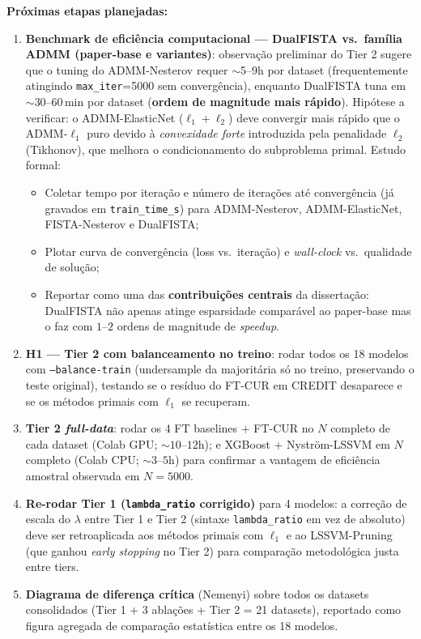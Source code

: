 \documentclass[12pt,a4paper]{article}
\begin{document}
\textbf{Próximas etapas planejadas:}
\begin{enumerate}\sloppy
  \item \textbf{Benchmark de eficiência computacional --- DualFISTA vs.\
        família ADMM (paper-base e variantes)}: observação preliminar do
        Tier 2 sugere que o tuning do ADMM-Nesterov requer $\sim$5--9h por
        dataset (frequentemente atingindo \texttt{max\_iter}=5000 sem
        convergência), enquanto DualFISTA tuna em $\sim$30--60\,min por
        dataset (\textbf{ordem de magnitude mais rápido}). Hipótese a
        verificar: o ADMM-ElasticNet ($\ell_1 + \ell_2$) deve convergir
        mais rápido que o ADMM-$\ell_1$ puro devido à \emph{convexidade
        forte} introduzida pela penalidade $\ell_2$ (Tikhonov), que
        melhora o condicionamento do subproblema primal. Estudo formal:
        \begin{itemize}
          \item Coletar tempo por iteração e número de iterações até
                convergência (já gravados em \texttt{train\_time\_s})
                para ADMM-Nesterov, ADMM-ElasticNet, FISTA-Nesterov
                e DualFISTA;
          \item Plotar curva de convergência (loss vs.\ iteração) e
                \emph{wall-clock} vs.\ qualidade de solução;
          \item Reportar como uma das \textbf{contribuições centrais} da
                dissertação: DualFISTA não apenas atinge esparsidade
                comparável ao paper-base mas o faz com $1$--$2$ ordens de
                magnitude de \emph{speedup}.
        \end{itemize}
  \item \textbf{H1 --- Tier 2 com balanceamento no treino}: rodar todos os
        18 modelos com \texttt{--balance-train} (undersample da
        majoritária só no treino, preservando o teste original), testando
        se o resíduo do FT-CUR em CREDIT desaparece e se os métodos
        primais com $\ell_1$ se recuperam.
  \item \textbf{Tier 2 \emph{full-data}}: rodar os $4$ FT baselines +
        FT-CUR no $N$ completo de cada dataset (Colab GPU; $\sim 10$--$12$h);
        e XGBoost + Nyström-LSSVM em $N$ completo (Colab CPU; $\sim 3$--$5$h)
        para confirmar a vantagem de eficiência amostral observada em
        $N=5000$.
  \item \textbf{Re-rodar Tier 1 (\texttt{lambda\_ratio} corrigido)} para
        4 modelos: a correção de escala do $\lambda$ entre Tier 1 e Tier 2
        (sintaxe \texttt{lambda\_ratio} em vez de absoluto) deve ser
        retroaplicada aos métodos primais com $\ell_1$ e ao
        LSSVM-Pruning (que ganhou \emph{early stopping} no Tier 2) para
        comparação metodológica justa entre tiers.
  \item \textbf{Diagrama de diferença crítica} (Nemenyi) sobre todos os
        datasets consolidados (Tier 1 + 3 ablações + Tier 2 = 21
        datasets), reportado como figura agregada de comparação
        estatística entre os 18 modelos.
\end{enumerate}
\end{document}
